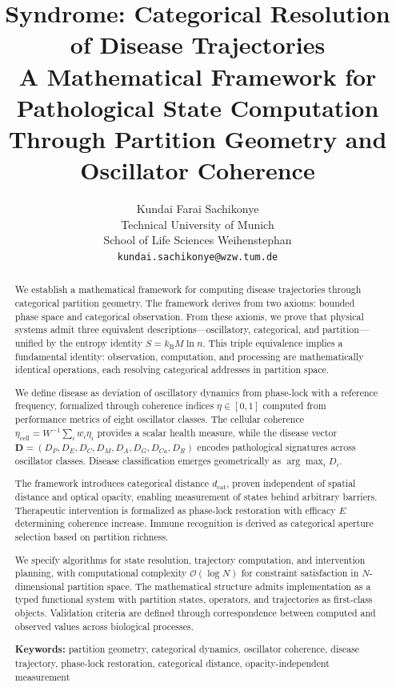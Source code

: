 \documentclass[10pt,twocolumn]{article}
\title{Syndrome: Categorical Resolution of Disease Trajectories\\[0.5em]
\large A Mathematical Framework for Pathological State Computation\\Through Partition Geometry and Oscillator Coherence}
\author{
Kundai Farai Sachikonye\\
Technical University of Munich\\
School of Life Sciences Weihenstephan\\
\texttt{kundai.sachikonye@wzw.tum.de}
}
\date{}
\theoremstyle{plain}
\theoremstyle{definition}
\theoremstyle{remark}
\newcommand{\kB}{k_{\mathrm{B}}}
\newcommand{\dcat}{d_{\mathrm{cat}}}
\newcommand{\etacell}{\eta_{\mathrm{cell}}}
\newcommand{\Dvec}{\mathbf{D}}
\newcommand{\bigO}{\mathcal{O}}
\begin{document}
\maketitle

\begin{abstract}
We establish a mathematical framework for computing disease trajectories through categorical partition geometry. The framework derives from two axioms: bounded phase space and categorical observation. From these axioms, we prove that physical systems admit three equivalent descriptions---oscillatory, categorical, and partition---unified by the entropy identity $S = \kB M \ln n$. This triple equivalence implies a fundamental identity: observation, computation, and processing are mathematically identical operations, each resolving categorical addresses in partition space.

We define disease as deviation of oscillatory dynamics from phase-lock with a reference frequency, formalized through coherence indices $\eta \in [0,1]$ computed from performance metrics of eight oscillator classes. The cellular coherence $\etacell = W^{-1}\sum_i w_i \eta_i$ provides a scalar health measure, while the disease vector $\Dvec = (D_P, D_E, D_C, D_M, D_A, D_G, D_{Ca}, D_R)$ encodes pathological signatures across oscillator classes. Disease classification emerges geometrically as $\arg\max_i D_i$.

The framework introduces categorical distance $\dcat$, proven independent of spatial distance and optical opacity, enabling measurement of states behind arbitrary barriers. Therapeutic intervention is formalized as phase-lock restoration with efficacy $E$ determining coherence increase. Immune recognition is derived as categorical aperture selection based on partition richness.

We specify algorithms for state resolution, trajectory computation, and intervention planning, with computational complexity $\bigO(\log N)$ for constraint satisfaction in $N$-dimensional partition space. The mathematical structure admits implementation as a typed functional system with partition states, operators, and trajectories as first-class objects. Validation criteria are defined through correspondence between computed and observed values across biological processes.

\vspace{0.5em}
\noindent\textbf{Keywords:} partition geometry, categorical dynamics, oscillator coherence, disease trajectory, phase-lock restoration, categorical distance, opacity-independent measurement
\end{abstract}
\end{document}
